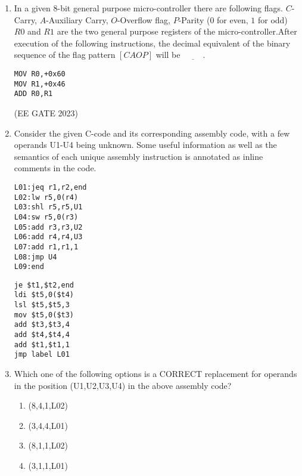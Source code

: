 \begin{enumerate}
\item In a given $8$-bit general purpose micro-controller there are following flags. $C$-Carry, $A$-Auxiliary Carry, $O$-Overflow flag, $P$-Parity ($0$ for even, $1$ for odd) $R0$ and $R1$ are the two general purpose registers of the micro-controller.After execution of the following instructions, the decimal equivalent of the binary sequence of the flag pattern $[CAOP]$ will be $\underline{\hspace{1cm}}$.\\


\begin{lstlisting}
MOV R0,+0x60
MOV R1,+0x46 
ADD R0,R1
\end{lstlisting}
    
\hfill{(EE GATE 2023)}\\


\item 
Consider the given C-code and its corresponding assembly code, with a few operands U1-U4 being unknown. Some useful information as well as the semantics of each unique assembly instruction is annotated as inline comments in the code.  

\begin{lstlisting}
L01:jeq r1,r2,end
L02:lw r5,0(r4)
L03:shl r5,r5,U1
L04:sw r5,0(r3)
L05:add r3,r3,U2
L06:add r4,r4,U3
L07:add r1,r1,1
L08:jmp U4
L09:end
\end{lstlisting}


\begin{lstlisting}
je $t1,$t2,end
ldi $t5,0($t4)
lsl $t5,$t5,3
mov $t5,0($t3)
add $t3,$t3,4
add $t4,$t4,4
add $t1,$t1,1
jmp label L01
\end{lstlisting}

\item Which one of the following options is a CORRECT replacement 
for operands in the position (U1,U2,U3,U4) in the above 
assembly code?

\begin{enumerate}
\item (8,4,1,L02)                      
\item (3,4,4,L01)
\item (8,1,1,L02)                             
\item (3,1,1,L01)         
\end{enumerate}

\end{enumerate}
